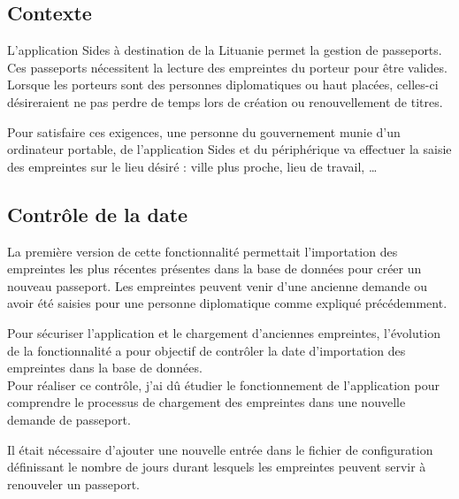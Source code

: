 \subsection{Contexte}

L'application Sides à destination de la Lituanie permet la gestion de passeports.
Ces passeports nécessitent la lecture des empreintes du porteur pour être valides.
Lorsque les porteurs sont des personnes diplomatiques ou haut placées, celles-ci désireraient ne pas perdre de temps lors de création ou renouvellement de titres.

Pour satisfaire ces exigences, une personne du gouvernement munie d'un ordinateur portable, de l'application Sides et du périphérique va effectuer la saisie des empreintes sur le lieu désiré : ville plus proche, lieu de travail, \ldots


\subsection{Contrôle de la date}

La première version de cette fonctionnalité permettait l'importation des empreintes les plus récentes présentes dans la base de données pour créer un nouveau passeport.
Les empreintes peuvent venir d'une ancienne demande ou avoir été saisies pour une personne diplomatique comme expliqué précédemment.

Pour sécuriser l'application et le chargement d'anciennes empreintes, l'évolution de la fonctionnalité a pour objectif de contrôler la date d'importation des empreintes dans la base de données.
\\

Pour réaliser ce contrôle, j'ai dû étudier le fonctionnement de l'application pour comprendre le processus de chargement des empreintes dans une nouvelle demande de passeport.

Il était nécessaire d'ajouter une nouvelle entrée dans le fichier de configuration définissant le nombre de jours durant lesquels les empreintes peuvent servir à renouveler un passeport.


